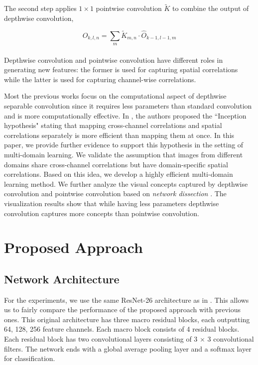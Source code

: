 \documentclass[letterpaper]{article} \usepackage{aaai19}  \usepackage{times}  \usepackage{helvet}  \usepackage{courier}  \usepackage{url}  \usepackage{graphicx}  \usepackage{amssymb}
\begin{document}
The second step applies $1 \times 1$ pointwise
convolution $\tilde{K}$ to combine the output of depthwise convolution,

\begin{equation}
    O_{k,l,n} = \sum_{m}\tilde{K}_{m,n} \cdot \hat{O}_{k-1, l-1,m}
\end{equation}
\\

Depthwise convolution and pointwise convolution have different roles in generating new features: the former is used for capturing spatial correlations while the latter is used for capturing channel-wise correlations.

Most the previous works \cite{chollet2017xception,howard2017mobilenets,sandler2018inverted} focus on the computational aspect of depthwise separable convolution since it requires less parameters than standard convolution and is more computationally effective. In \cite{chollet2017xception}, the authors proposed the ``Inception hypothesis" stating that mapping cross-channel correlations and spatial correlations separately is more efficient than mapping them at once. In this paper, we provide further evidence to support this hypothesis in the setting of multi-domain learning. We validate the assumption that images from different domains share cross-channel correlations but have domain-specific spatial correlations. Based on this idea, we develop a highly efficient multi-domain learning method. We further analyze the visual concepts captured by depthwise convolution and pointwise convolution based on \textit{network dissection} \cite{bau2017network}. The visualization results show that while having less parameters depthwise convolution captures more concepts than pointwise convolution.
 
 
\section{Proposed Approach}
\iffalse
This section presents our proposed approach for multi-domain learning. We start with the network architecture. Then we introduce how to extend a single domain neural network to multiple domains. Finally, we propose a soft sharing method to encourage the maximal information sharing across different domains.
\fi
\subsection{Network Architecture}
For the experiments, we use the same ResNet-26 architecture as in \cite{rebuffi18efficient}. This allows us to fairly compare the performance of the proposed approach with previous ones. This original architecture has three macro residual blocks, each outputting 64, 128, 256 feature channels. Each macro block consists of 4 residual blocks. Each residual block has two convolutional layers consisting of 3 $\times$ 3 convolutional filters. The network ends with a global average pooling layer and a softmax layer for classification. 
\end{document}
